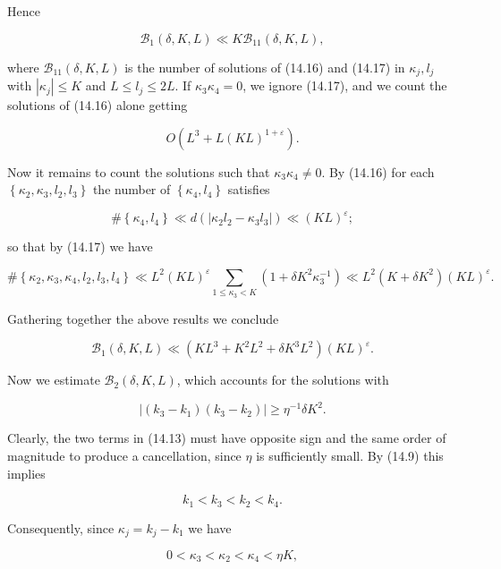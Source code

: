 \documentclass[10pt]{article}
\begin{document}
Hence

$$
\mathscr{B}_{1}(\delta,K,L)\ll K\mathscr{B}_{11}(\delta,K,L),
$$

where $\mathscr{B}_{11}(\delta, K, L)$ is the number of solutions of (14.16) and (14.17) in $\kappa_{j}, l_{j}$ with $\left|\kappa_{j}\right| \leqslant K$ and $L \leqslant l_{j} \leqslant 2 L$. If $\kappa_{3} \kappa_{4}=0$, we ignore (14.17), and we count the solutions of (14.16) alone getting

$$
O\left(L^{3}+L(K L)^{1+\varepsilon}\right) .
$$

Now it remains to count the solutions such that $\kappa_{3} \kappa_{4} \neq 0$. By (14.16) for each $\left\{\kappa_{2}, \kappa_{3}, l_{2}, l_{3}\right\}$ the number of $\left\{\kappa_{4}, l_{4}\right\}$ satisfies

$$
\#\left\{\kappa_{4},l_{4}\right\}\ll d\left(\left|\kappa_{2} l_{2}-\kappa_{3} l_{3}\right|\right) \ll(K L)^{\varepsilon} ;
$$

so that by (14.17) we have

$$
\#\left\{\kappa_{2},\kappa_{3},\kappa_{4},l_{2},l_{3},l_{4}\right\}
\ll L^{2}(KL)^{\varepsilon}\sum_{1\leqslant\kappa_{3}<K}
\left(1+\delta K^{2}\kappa_{3}^{-1}\right)
\ll L^{2}\left(K+\delta K^{2}\right)(KL)^{\varepsilon}.
$$

Gathering together the above results we conclude


\begin{equation*}
\mathscr{B}_{1}(\delta, K, L) \ll\left(K L^{3}+K^{2} L^{2}+\delta K^{3} L^{2}\right)(K L)^{\varepsilon} . \tag{14.18}
\end{equation*}


Now we estimate $\mathscr{B}_{2}(\delta, K, L)$, which accounts for the solutions with


\begin{equation*}
\left|\left(k_{3}-k_{1}\right)\left(k_{3}-k_{2}\right)\right| \geqslant \eta^{-1} \delta K^{2} . \tag{14.19}
\end{equation*}


Clearly, the two terms in (14.13) must have opposite sign and the same order of magnitude to produce a cancellation, since $\eta$ is sufficiently small. By (14.9) this implies

$$
k_{1}<k_{3}<k_{2}<k_{4} .
$$

Consequently, since $\kappa_{j}=k_{j}-k_{1}$ we have


\begin{equation*}
0<\kappa_{3}<\kappa_{2}<\kappa_{4}<\eta K, \tag{14.20}
\end{equation*}
\end{document}

